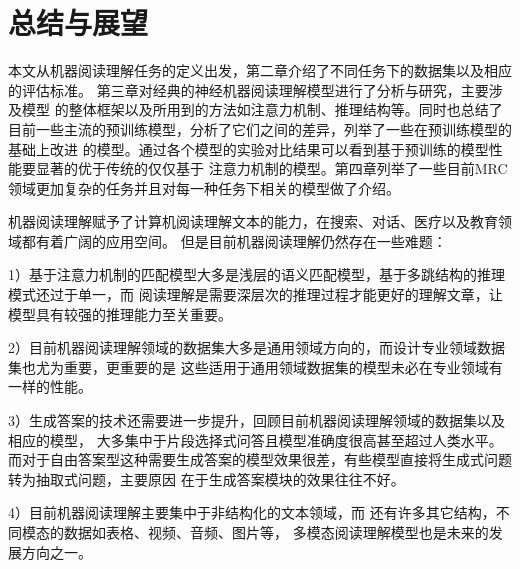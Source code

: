 \documentclass{article}
\begin{document}

%
\section{总结与展望}
本文从机器阅读理解任务的定义出发，第二章介绍了不同任务下的数据集以及相应的评估标准。
第三章对经典的神经机器阅读理解模型进行了分析与研究，主要涉及模型
的整体框架以及所用到的方法如注意力机制、推理结构等。同时也总结了
目前一些主流的预训练模型，分析了它们之间的差异，列举了一些在预训练模型的基础上改进
的模型。通过各个模型的实验对比结果可以看到基于预训练的模型性能要显著的优于传统的仅仅基于
注意力机制的模型。第四章列举了一些目前MRC领域更加复杂的任务并且对每一种任务下相关的模型做了介绍。

机器阅读理解赋予了计算机阅读理解文本的能力，在搜索、对话、医疗以及教育领域都有着广阔的应用空间。
但是目前机器阅读理解仍然存在一些难题：

1）基于注意力机制的匹配模型大多是浅层的语义匹配模型，基于多跳结构的推理模式还过于单一，而
阅读理解是需要深层次的推理过程才能更好的理解文章，让模型具有较强的推理能力至关重要。

2）目前机器阅读理解领域的数据集大多是通用领域方向的，而设计专业领域数据集也尤为重要，更重要的是
这些适用于通用领域数据集的模型未必在专业领域有一样的性能。

3）生成答案的技术还需要进一步提升，回顾目前机器阅读理解领域的数据集以及相应的模型，
大多集中于片段选择式问答且模型准确度很高甚至超过人类水平。
而对于自由答案型这种需要生成答案的模型效果很差，有些模型直接将生成式问题转为抽取式问题，主要原因
在于生成答案模块的效果往往不好。

4）目前机器阅读理解主要集中于非结构化的文本领域，而
还有许多其它结构，不同模态的数据如表格、视频、音频、图片等，
多模态阅读理解模型也是未来的发展方向之一。




\printbibliography[title={参考文献}]
\end{document}
